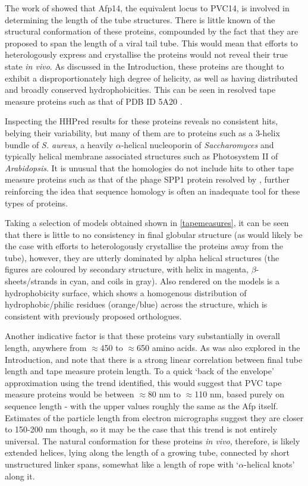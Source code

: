 The work of \cite{Rybakova2015} showed that Afp14, the equivalent locus to PVC14, is involved in determining the length of the tube structures. There is little known of the structural conformation of these proteins, compounded by the fact that they are proposed to span the length of a viral tail tube. This would mean that efforts to heterologously express and crystallise the proteins would not reveal their true state \emph{in vivo}. As discussed in the Introduction, these proteins are thought to exhibit a disproportionately high degree of helicity, as well as having distributed and broadly conserved hydrophobicities. This can be seen in resolved tape measure proteins such as that of PDB ID 5A20 \citep{Chaban2015}.

Inspecting the HHPred results for these proteins reveals no consistent hits, belying their variability, but many of them are to proteins such as a 3-helix bundle of \emph{S. aureus}, a heavily $\alpha$-helical nucleoporin of \emph{Saccharomyces} and typically helical membrane associated structures such as Photosystem II of \emph{Arabidopsis}. It is unusual that the homologies do not include hits to other tape measure proteins such as that of the phage SPP1 protein resolved by \cite{Chaban2015}, further reinforcing the idea that sequence homology is often an inadequate tool for these types of proteins.

Taking a selection of models obtained shown in \vref{tapemeasures}, it can be seen that there is little to no consistency in final globular structure (as would likely be the case with efforts to heterologously crystallise the proteins away from the tube), however, they are utterly dominated by alpha helical structures (the figures are coloured by secondary structure, with helix in magenta, $\beta$-sheets/strands in cyan, and coils in gray). Also rendered on the models is a hydrophobicity surface, which shows a homogenous distribution of hydrophobic/philic residues (orange/blue) across the structure, which is consistent with previously proposed orthologues.

Another indicative factor is that these proteins vary substantially in overall length, anywhere from $\approx$450 to $\approx$650 amino acids. As was also explored in the Introduction, \cite{Rybakova2015} and \cite{Pedulla2003} note that there is a strong linear correlation between final tube length and tape measure protein length. To a quick `back of the envelope' approximation using the trend identified, this would suggest that PVC tape measure proteins would be between $\approx$80 nm to $\approx$110 nm, based purely on sequence length - with the upper values roughly the same as the Afp itself. Estimates of the particle length from electron micrographs suggest they are closer to 150-200 nm though, so it may be the case that this trend is not entirely universal. The natural conformation for these proteins \emph{in vivo}, therefore, is likely extended helices, lying along the length of a growing tube, connected by short unstructured linker spans, somewhat like a length of rope with `$\alpha$-helical knots' along it.

